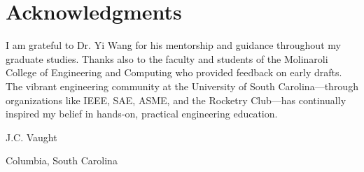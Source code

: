 {    \section*{Acknowledgments}

    I am grateful to Dr. Yi Wang for his mentorship and guidance throughout my graduate studies. Thanks also to the faculty and students of the Molinaroli College of Engineering and Computing who provided feedback on early drafts. The vibrant engineering community at the University of South Carolina---through organizations like IEEE, SAE, ASME, and the Rocketry Club---has continually inspired my belief in hands-on, practical engineering education.

    \vspace{1cm}

    \hfill J.C. Vaught

    \hfill Columbia, South Carolina

    \hfill \textbookyear
}

